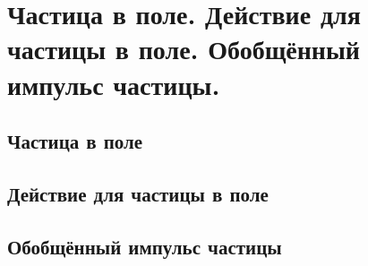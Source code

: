\chapter{Частица в поле. Действие для частицы в поле. Обобщённый 
импульс частицы.}

\section{Частица в поле}
\section{Действие для частицы в поле}
\section{Обобщённый импульс частицы}
